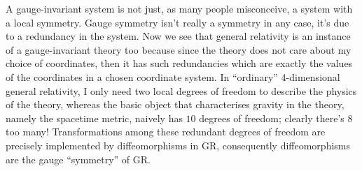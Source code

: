 A gauge-invariant system is not just, as many people misconceive, a system with a local symmetry. Gauge symmetry isn’t really a symmetry in any case, it’s due to a redundancy in the system. Now we see that general relativity is an instance of a gauge-invariant theory too because since the theory does not care about my choice of coordinates, then it has such redundancies which are exactly the values of the coordinates in a chosen coordinate system. In “ordinary” 4-dimensional general relativity, I only need two local degrees of freedom to describe the physics of the theory, whereas the basic object that characterises gravity in the theory, namely the spacetime metric, naively has $10$ degrees of freedom; clearly there’s $8$ too many! Transformations among these redundant degrees of freedom are precisely implemented by diffeomorphisms in GR, consequently diffeomorphisms are the gauge “symmetry” of GR.


